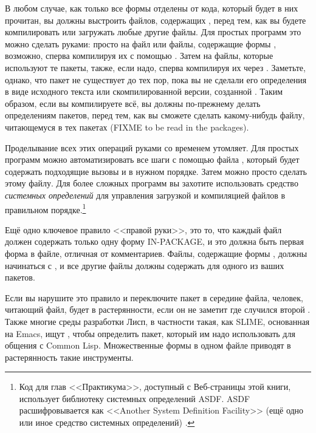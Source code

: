 В любом случае, как только все формы  отделены от кода, который будет в
них прочитан, вы должны выстроить  файлов, содержащих , перед
тем, как вы будете компилировать или загружать любые другие файлы. Для простых программ
это можно сделать руками: просто  на файл или файлы, содержащие формы
, возможно, сперва компилируя их с помощью . Затем
 на файлы, которые используют те пакеты, также, если надо, сперва компилируя их
через . Заметьте, однако, что пакет не существует до тех пор, пока вы
не сделали  его определения в виде исходного текста или скомпилированной
версии, созданной . Таким образом, если вы компилируете всё, вы должны
по-прежнему делать  определениям пакетов, перед тем, как вы сможете сделать
 какому-нибудь файлу, читающемуся в тех пакетах (FIXME to be read in
the packages).

Проделывание всех этих операций руками со временем утомляет.  Для простых программ можно
автоматизировать все шаги с помощью файла , который будет содержать
подходящие вызовы  и  в нужном порядке. Затем можно просто
сделать  этому файлу. Для более сложных программ вы захотите использовать
средство \textit{системных определений} для управления загрузкой и компиляцией файлов в
правильном порядке.\footnote{Код для глав <<Практикума>>, доступный с Веб-страницы этой
  книги, использует библиотеку системных определений ASDF. ASDF расшифровывается как
  <<Another System Definition Facility>> (ещё одно или иное средство системных определений)
  .}

Ещё одно ключевое правило <<правой руки>>, это то, что каждый файл должен содержать только
одну форму IN-PACKAGE, и это должна быть первая форма в файле, отличная от комментариев.
Файлы, содержащие формы , должны начинаться с , и все другие файлы должны содержать  для одного из
ваших пакетов.

Если вы нарушите это правило и переключите пакет в середине файла, человек, читающий файл,
будет в растерянности, если он не заметит где случился второй . Также
многие среды разработки Лисп, в частности такая, как SLIME, основанная на Emacs, ищут
, чтобы определить пакет, который им надо использовать для общения с
Common Lisp. Множественные формы  в одном файле приводят в растерянность
такие инструменты.

